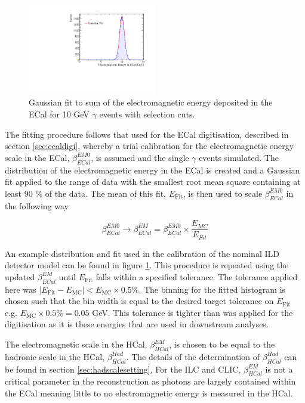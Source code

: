 \begin{figure}
\includegraphics[width=0.5\textwidth]{EnergyEstimators/Plots/Calibration/EMScaleSetting/EMScaleSettingECalFit.pdf}
\caption[Gaussian fit to sum of the electromagnetic energy deposited in the ECal for 10 GeV $\gamma$ events with selection cuts.]{Gaussian fit to sum of the electromagnetic energy deposited in the ECal for 10 GeV $\gamma$ events with selection cuts.}
\label{fig:ecalemscalefit}
\end{figure}

The fitting procedure follows that used for the ECal digitisation, described in section \ref{sec:ecaldigi}, whereby a trial calibration for the electromagnetic energy scale in the ECal, $\beta^{EM0}_{ECal}$, is assumed and the single $\gamma$ events simulated.  The distribution of the electromagnetic energy in the ECal is created and a Gaussian fit applied to the range of data with the smallest root mean square containing at least 90 \% of the data.  The mean of this fit, $E_{\text{Fit}}$, is then used to scale $\beta^{EM0}_{ECal}$ in the following way

\begin{equation}
\beta^{EM0}_{ECal} \rightarrow \beta^{EM}_{ECal} = \beta^{EM0}_{ECal} \times \frac{E_{MC}}{E_{Fit}}
\end{equation}

An example distribution and fit used in the calibration of the nominal ILD detector model can be found in figure \ref{fig:ecalemscalefit}.  This procedure is repeated using the updated $\beta^{EM}_{ECal}$ until $E_{\text{Fit}}$ falls within a specified tolerance.  The tolerance applied here was $|E_{\text{Fit}} - E_{\text{MC}}| < E_{\text{MC}} \times 0.5 \%$.  The binning for the fitted histogram is chosen such that the bin width is equal to the desired target tolerance on $E_{\text{Fit}}$ e.g. $E_{\text{MC}} \times 0.5 \% = 0.05$ GeV.  This tolerance is tighter than was applied for the digitisation as it is these energies that are used in downstream analyses.   
 
The electromagnetic scale in the HCal, $\beta^{EM}_{HCal}$, is chosen to be equal to the hadronic scale in the HCal, $\beta^{Had}_{HCal}$.  The details of the determination of $\beta^{Had}_{HCal}$ can be found in section \ref{sec:hadscalesetting}.  For the ILC and CLIC, $\beta^{EM}_{HCal}$ is not a critical parameter in the reconstruction as photons are largely contained within the ECal meaning little to no electromagnetic energy is measured in the HCal.  

